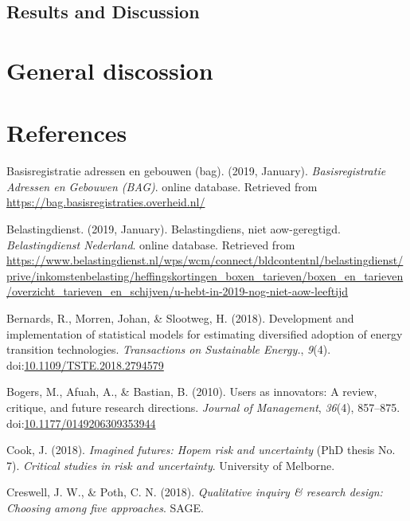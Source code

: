 \documentclass[man,floatsintext]{apa6}
\begin{document}
\subsection{Results and Discussion}\label{results-and-discussion-1}

\section{General discossion}\label{general-discossion}

\newpage

\section{References}\label{references}

\begingroup
\setlength{\parindent}{-0.5in} \setlength{\leftskip}{0.5in}

\hypertarget{refs}{}
\hypertarget{ref-BAG}{}
Basisregistratie adressen en gebouwen (bag). (2019, January).
\emph{Basisregistratie Adressen en Gebouwen (BAG)}. online database.
Retrieved from \url{https://bag.basisregistraties.overheid.nl/}

\hypertarget{ref-belastingdienst_2019}{}
Belastingdienst. (2019, January). Belastingdiens, niet aow-geregtigd.
\emph{Belastingdienst Nederland}. online database. Retrieved from
\url{https://www.belastingdienst.nl/wps/wcm/connect/bldcontentnl/belastingdienst/prive/inkomstenbelasting/heffingskortingen_boxen_tarieven/boxen_en_tarieven/overzicht_tarieven_en_schijven/u-hebt-in-2019-nog-niet-aow-leeftijd}

\hypertarget{ref-Bernards_2018}{}
Bernards, R., Morren, Johan, \& Slootweg, H. (2018). Development and
implementation of statistical models for estimating diversified adoption
of energy transition technologies. \emph{Transactions on Sustainable
Energy.}, \emph{9}(4).
doi:\href{https://doi.org/10.1109/TSTE.2018.2794579}{10.1109/TSTE.2018.2794579}

\hypertarget{ref-bogers_2010}{}
Bogers, M., Afuah, A., \& Bastian, B. (2010). Users as innovators: A
review, critique, and future research directions. \emph{Journal of
Management}, \emph{36}(4), 857--875.
doi:\href{https://doi.org/10.1177/0149206309353944}{10.1177/0149206309353944}

\hypertarget{ref-Cook_2018}{}
Cook, J. (2018). \emph{Imagined futures: Hopem risk and uncertainty}
(PhD thesis No. 7). \emph{Critical studies in risk and uncertainty}.
University of Melborne.

\hypertarget{ref-creswell_poth_2018}{}
Creswell, J. W., \& Poth, C. N. (2018). \emph{Qualitative inquiry \&
research design: Choosing among five approaches}. SAGE.
\end{document}
